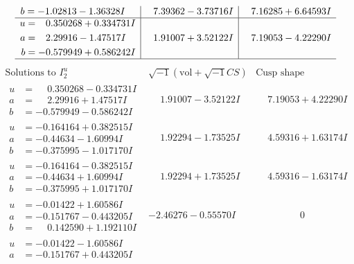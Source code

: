 \documentclass[1p]{elsarticle_modified}
\theoremstyle{definition}
\newcommand{\I}{\sqrt{-1}}
\begin{document}
$$\begin{array}{c|c|c}
\begin{aligned}
b &= -1.02813 - 1.36328 I\end{aligned}
 & \phantom{-}7.39362 - 3.73716 I & \phantom{-}7.16285 + 6.64593 I \\ \hline\begin{aligned}
u &= \phantom{-}0.350268 + 0.334731 I \\
a &= \phantom{-}2.29916 - 1.47517 I \\
b &= -0.579949 + 0.586242 I\end{aligned}
 & \phantom{-}1.91007 + 3.52122 I & \phantom{-}7.19053 - 4.22290 I\\
 \hline 
 \end{array}$$\newpage$$\begin{array}{c|c|c}  
\text{Solutions to }I^u_{2}& \I (\text{vol} + \sqrt{-1}CS) & \text{Cusp shape}\\
 \hline 
\begin{aligned}
u &= \phantom{-}0.350268 - 0.334731 I \\
a &= \phantom{-}2.29916 + 1.47517 I \\
b &= -0.579949 - 0.586242 I\end{aligned}
 & \phantom{-}1.91007 - 3.52122 I & \phantom{-}7.19053 + 4.22290 I \\ \hline\begin{aligned}
u &= -0.164164 + 0.382515 I \\
a &= -0.44634 - 1.60994 I \\
b &= -0.375995 - 1.017170 I\end{aligned}
 & \phantom{-}1.92294 - 1.73525 I & \phantom{-}4.59316 + 1.63174 I \\ \hline\begin{aligned}
u &= -0.164164 - 0.382515 I \\
a &= -0.44634 + 1.60994 I \\
b &= -0.375995 + 1.017170 I\end{aligned}
 & \phantom{-}1.92294 + 1.73525 I & \phantom{-}4.59316 - 1.63174 I \\ \hline\begin{aligned}
u &= -0.01422 + 1.60586 I \\
a &= -0.151767 - 0.443205 I \\
b &= \phantom{-}0.142590 + 1.192110 I\end{aligned}
 & -2.46276 - 0.55570 I & \phantom{-0.000000 } 0 \\ \hline\begin{aligned}
u &= -0.01422 - 1.60586 I \\
a &= -0.151767 + 0.443205 I \\

\end{aligned}
\end{array}$$
\end{document}
